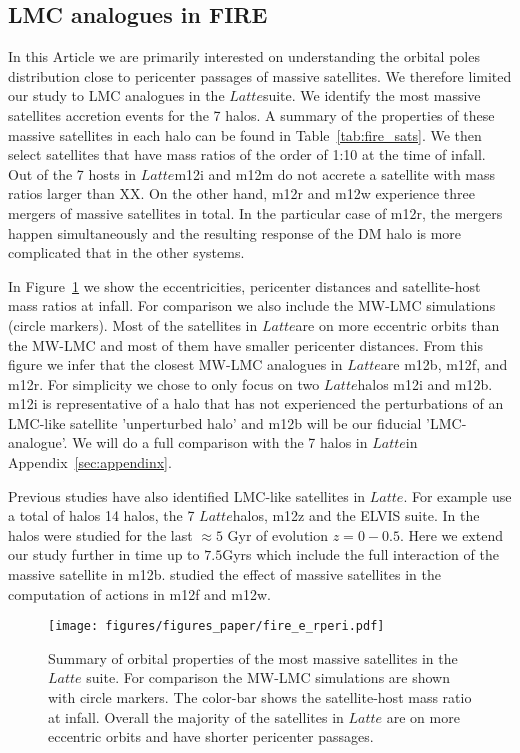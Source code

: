 \documentclass{aastex63}
\newcommand{\latte}{$Latte$}
\begin{document}
\subsection{LMC analogues in FIRE}

In this Article we are primarily interested on understanding the orbital poles distribution close to pericenter passages of massive satellites. We therefore limited our study to LMC analogues in the \latte suite. We identify the most massive satellites accretion events for the 7 halos. A summary of the properties of these massive satellites in each halo can be found in Table~\ref{tab:fire_sats}. 
We then select satellites that have mass ratios of the order of 1:10 at the time of infall. Out of the 7 hosts in \latte m12i and m12m do not accrete a satellite with mass ratios larger than XX. On the other hand, m12r and m12w experience three mergers of massive satellites in total. In the particular case of m12r, the mergers happen simultaneously and the resulting response of the DM halo is more complicated that in the other systems. 



In Figure~\ref{fig:orbits_properties} we show the eccentricities, pericenter distances and satellite-host mass ratios at infall. For comparison we also include the MW-LMC simulations (circle markers). Most of the satellites in \latte are on more eccentric orbits than the MW-LMC and most of them have smaller pericenter distances. From this figure we infer that the closest MW-LMC analogues in \latte are m12b, m12f, and m12r. For simplicity we chose to only focus on two \latte halos m12i and m12b. m12i is representative of a halo that has not experienced the perturbations of an LMC-like satellite 'unperturbed halo' and m12b will be our fiducial 'LMC-analogue'. We will do a full comparison with the 7 halos in \latte in Appendix~\ref{sec:appendinx}. 

Previous studies have also identified LMC-like satellites in \latte. For example \cite{Samuel21} use a total of halos 14 halos, the 7 \latte halos, m12z and the ELVIS suite. In \cite{Samuel21} the halos were studied for the last $\approx5$ Gyr of evolution $z=0-0.5$. Here we extend our study further in time up to $7.5$Gyrs which include the full interaction of the massive satellite in m12b. 
\cite{Arora} studied the effect of massive satellites in the computation of actions in m12f and m12w. 


\begin{figure}[H]
    \centering
    \texttt{[image: figures/figures\_paper/fire\_e\_rperi.pdf]}
    \caption{Summary of orbital properties of the most massive satellites in the $Latte$ suite. For comparison the MW-LMC simulations are shown with circle markers. The color-bar shows the satellite-host mass ratio at infall. Overall the majority of the satellites in $Latte$ are on more eccentric orbits and have shorter pericenter passages.}
    \label{fig:orbits_properties}
\end{figure}
\end{document}

